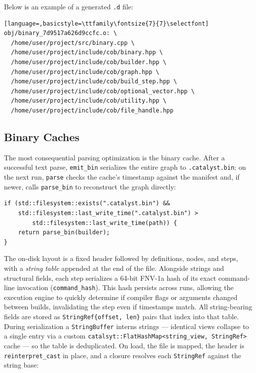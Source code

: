 \documentclass[11pt]{article}
\begin{document}
Below is an example of a generated \texttt{.d} file:

\begin{lstlisting}[language=,basicstyle=\ttfamily\fontsize{7}{7}\selectfont]
obj/binary_7d9517a626d9ccfc.o: \
  /home/user/project/src/binary.cpp \
  /home/user/project/include/cob/binary.hpp \
  /home/user/project/include/cob/builder.hpp \
  /home/user/project/include/cob/graph.hpp \
  /home/user/project/include/cob/build_step.hpp \
  /home/user/project/include/cob/optional_vector.hpp \
  /home/user/project/include/cob/utility.hpp \
  /home/user/project/include/cob/file_handle.hpp
\end{lstlisting}

\subsection{Binary Caches}

The most consequential parsing optimization is the binary cache. After a
successful text parse, \lstinline|emit_bin| serializes the entire graph to
\texttt{.catalyst.bin}; on the next run, \lstinline|parse| checks the cache's
timestamp against the manifest and, if newer, calls \lstinline|parse_bin| to
reconstruct the graph directly:

\begin{lstlisting}
if (std::filesystem::exists(".catalyst.bin") &&
    std::filesystem::last_write_time(".catalyst.bin") >
        std::filesystem::last_write_time(path)) {
    return parse_bin(builder);
}
\end{lstlisting}

The on-disk layout is a fixed header followed by definitions, nodes, and steps,
with a \emph{string table} appended at the end of the file. Alongside strings and structural fields, each step serializes a 64-bit FNV-1a hash of its exact command-line invocation (\lstinline|command_hash|). This hash persists across runs, allowing the execution engine to quickly determine if compiler flags or arguments changed between builds, invalidating the step even if timestamps match. All string-bearing
fields are stored as \lstinline|StringRef{offset, len}| pairs that index into
that table. During serialization a \lstinline|StringBuffer| interns strings ---
identical views collapse to a single entry via a custom
\lstinline|catalsyt::FlatHashMap<string_view, StringRef>| cache --- so the table is
deduplicated. On load, the file is mapped, the header is
\lstinline|reinterpret_cast| in place, and a closure resolves each
\lstinline|StringRef| against the string base:
\end{document}
